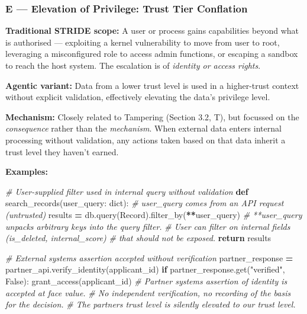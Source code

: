 \documentclass[a4paper,11pt]{report}
\newenvironment{Shaded}{\begin{snugshade}}{\end{snugshade}}
\newcommand{\BuiltInTok}[1]{#1}
\newcommand{\CommentTok}[1]{\textcolor[rgb]{0.56,0.35,0.01}{\textit{#1}}}
\newcommand{\ControlFlowTok}[1]{\textcolor[rgb]{0.13,0.29,0.53}{\textbf{#1}}}
\newcommand{\KeywordTok}[1]{\textcolor[rgb]{0.13,0.29,0.53}{\textbf{#1}}}
\newcommand{\NormalTok}[1]{#1}
\newcommand{\OperatorTok}[1]{\textcolor[rgb]{0.81,0.36,0.00}{\textbf{#1}}}
\newcommand{\StringTok}[1]{\textcolor[rgb]{0.31,0.60,0.02}{#1}}
\newcommand{\VariableTok}[1]{\textcolor[rgb]{0.00,0.00,0.00}{#1}}
\begin{document}
\hypertarget{e-elevation-of-privilege-trust-tier-conflation}{%
\subsubsection{E --- Elevation of Privilege: Trust Tier
Conflation}\label{e-elevation-of-privilege-trust-tier-conflation}}

\textbf{Traditional STRIDE scope:} A user or process gains capabilities
beyond what is authorised --- exploiting a kernel vulnerability to move
from user to root, leveraging a misconfigured role to access admin
functions, or escaping a sandbox to reach the host system. The
escalation is of \emph{identity or access rights}.

\textbf{Agentic variant:} Data from a lower trust level is used in a
higher-trust context without explicit validation, effectively elevating
the data's privilege level.

\textbf{Mechanism:} Closely related to Tampering (Section 3.2, T), but
focussed on the \emph{consequence} rather than the \emph{mechanism}.
When external data enters internal processing without validation, any
actions taken based on that data inherit a trust level they haven't
earned.

\textbf{Examples:}

\begin{Shaded}
\begin{Highlighting}[]
\CommentTok{\# User{-}supplied filter used in internal query without validation}
\KeywordTok{def}\NormalTok{ search\_records(user\_query: }\BuiltInTok{dict}\NormalTok{):}
    \CommentTok{\# user\_query comes from an API request (untrusted)}
\NormalTok{    results }\OperatorTok{=}\NormalTok{ db.query(Record).filter\_by(}\OperatorTok{**}\NormalTok{user\_query)}
    \CommentTok{\# **user\_query unpacks arbitrary keys into the query filter.}
    \CommentTok{\# User can filter on internal fields (is\_deleted, internal\_score)}
    \CommentTok{\# that should not be exposed.}
    \ControlFlowTok{return}\NormalTok{ results}

\CommentTok{\# External system\textquotesingle{}s assertion accepted without verification}
\NormalTok{partner\_response }\OperatorTok{=}\NormalTok{ partner\_api.verify\_identity(applicant\_id)}
\ControlFlowTok{if}\NormalTok{ partner\_response.get(}\StringTok{"verified"}\NormalTok{, }\VariableTok{False}\NormalTok{):}
\NormalTok{    grant\_access(applicant\_id)}
    \CommentTok{\# Partner system\textquotesingle{}s assertion of identity is accepted at face value.}
    \CommentTok{\# No independent verification, no recording of the basis for the decision.}
    \CommentTok{\# The partner\textquotesingle{}s trust level is silently elevated to our trust level.}
\end{Highlighting}
\end{Shaded}
\end{document}
